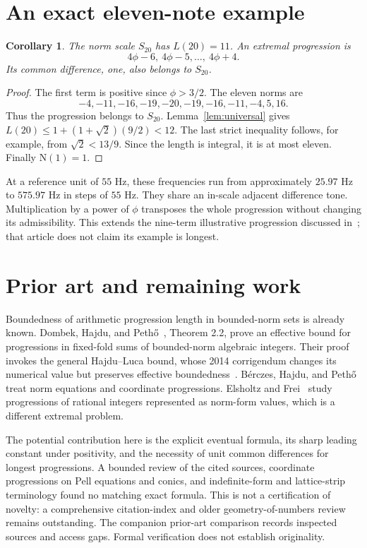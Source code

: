 \documentclass[11pt]{article}
\newtheorem{corollary}[theorem]{Corollary}
\newcommand{\N}{\mathrm N}
\begin{document}
\section{An exact eleven-note example}
\begin{corollary}
The norm scale $S_{20}$ has $L(20)=11$. An extremal progression is
\[
 4\phi-6,\ 4\phi-5,\ldots,\ 4\phi+4.
\]
Its common difference, one, also belongs to $S_{20}$.
\end{corollary}
\begin{proof}
The first term is positive since $\phi>3/2$. The eleven norms are
\[
 -4,-11,-16,-19,-20,-19,-16,-11,-4,5,16.
\]
Thus the progression belongs to $S_{20}$. Lemma~\ref{lem:universal} gives
$L(20)\le1+(1+\sqrt2)(9/2)<12$. The last strict inequality follows, for example, from $\sqrt2<13/9$. Since the length is integral, it is at most eleven. Finally $\N(1)=1$.
\end{proof}
At a reference unit of $55$ Hz, these frequencies run from approximately $25.97$ Hz to $575.97$ Hz in steps of $55$ Hz. They share an in-scale adjacent difference tone. Multiplication by a power of $\phi$ transposes the whole progression without changing its admissibility. This extends the nine-term illustrative progression discussed in~\cite{DTW}; that article does not claim its example is longest.

\section{Prior art and remaining work}
Boundedness of arithmetic progression length in bounded-norm sets is already known. Dombek, Hajdu, and Peth\H{o}~\cite{DHP}, Theorem 2.2, prove an effective bound for progressions in fixed-fold sums of bounded-norm algebraic integers. Their proof invokes the general Hajdu--Luca bound, whose 2014 corrigendum changes its numerical value but preserves effective boundedness~\cite{HL}. B\'erczes, Hajdu, and Peth\H{o}~\cite{BHP} treat norm equations and coordinate progressions. Elsholtz and Frei~\cite{EF} study progressions of rational integers represented as norm-form values, which is a different extremal problem.

The potential contribution here is the explicit eventual formula, its sharp leading constant under positivity, and the necessity of unit common differences for longest progressions. A bounded review of the cited sources, coordinate progressions on Pell equations and conics, and indefinite-form and lattice-strip terminology found no matching exact formula. This is not a certification of novelty: a comprehensive citation-index and older geometry-of-numbers review remains outstanding. The companion prior-art comparison records inspected sources and access gaps. Formal verification does not establish originality.
\end{document}
